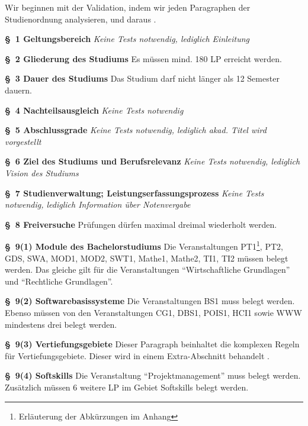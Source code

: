\documentclass[ngerman]{article}
\begin{document}
Wir beginnen mit der Validation, indem wir jeden Paragraphen der Studienordnung analysieren, und daraus \todo{}.

\setlength{\parindent}{0cm}

\begin{paracol}{2}
\textbf{§~1 Geltungsbereich}
\switchcolumn
\emph{Keine Tests notwendig, lediglich Einleitung}
\\
\switchcolumn*

\textbf{§~2 Gliederung des Studiums}
\switchcolumn
Es müssen mind. 180 LP erreicht werden.
\\
\switchcolumn*

\textbf{§~3 Dauer des Studiums}
\switchcolumn
Das Studium darf nicht länger als 12 Semester dauern.
\\
\switchcolumn*

\textbf{§~4 Nachteilsausgleich}
\switchcolumn
\emph{Keine Tests notwendig}
\\
\switchcolumn*

\textbf{§~5 Abschlussgrade}
\switchcolumn
\emph{Keine Tests notwendig, lediglich akad. Titel wird vorgestellt}
\\
\switchcolumn*

\textbf{§~6 Ziel des Studiums und Berufsrelevanz}
\switchcolumn
\emph{Keine Tests notwendig, lediglich Vision des Studiums}
\\
\switchcolumn*

\textbf{§~7 Studienverwaltung; Leistungserfassungsprozess}
\switchcolumn
\emph{Keine Tests notwendig, lediglich Information über Notenvergabe}
\\
\switchcolumn*

\textbf{§~8 Freiversuche}
\switchcolumn
Prüfungen dürfen maximal dreimal wiederholt werden.
\\
\switchcolumn* 

\textbf{§~9(1) Module des Bachelorstudiums}
\switchcolumn
Die Veranstaltungen PT1\footnote{Erläuterung der Abkürzungen im Anhang}, PT2, GDS, SWA, MOD1, MOD2, SWT1, Mathe1, Mathe2, TI1, TI2 müssen belegt werden.
Das gleiche gilt für die Veranstaltungen ``Wirtschaftliche Grundlagen'' und ``Rechtliche Grundlagen''.
\\
\switchcolumn*

\textbf{§~9(2) Softwarebasissysteme}
\switchcolumn
Die Veranstaltungen BS1 muss belegt werden.
Ebenso müssen von den Veranstaltungen CG1, DBS1, POIS1, HCI1 sowie WWW mindestens drei belegt werden.
\\
\switchcolumn*

\textbf{§~9(3) Vertiefungsgebiete}
\switchcolumn
Dieser Paragraph beinhaltet die komplexen Regeln für Vertiefungsgebiete.
Dieser wird in einem Extra-Abschnitt behandelt .
\\
\switchcolumn*

\textbf{§~9(4) Softskills}
\switchcolumn
Die Veranstaltung ``Projektmanagement'' muss belegt werden.
Zusätzlich müssen 6 weitere LP im Gebiet Softskills belegt werden.
\\
\switchcolumn*

\end{paracol}
\end{document}
